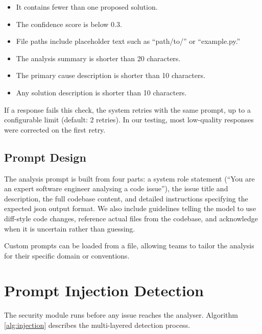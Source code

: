 \begin{itemize}
\item It contains fewer than one proposed solution.
\item The confidence score is below 0.3.
\item File paths include placeholder text such as ``path/to/'' or ``example.py.''
\item The analysis summary is shorter than 20 characters.
\item The primary cause description is shorter than 10 characters.
\item Any solution description is shorter than 10 characters.
\end{itemize}

If a response fails this check, the system retries with the same prompt, up to a configurable limit (default: 2 retries). In our testing, most low-quality responses were corrected on the first retry.

\subsection{Prompt Design}
The analysis prompt is built from four parts: a system role statement (``You are an expert software engineer analysing a code issue''), the issue title and description, the full codebase content, and detailed instructions specifying the expected \gls{json} output format. We also include guidelines telling the model to use diff-style code changes, reference actual files from the codebase, and acknowledge when it is uncertain rather than guessing.

Custom prompts can be loaded from a file, allowing teams to tailor the analysis for their specific domain or conventions.

\section{Prompt Injection Detection}

The security module runs before any issue reaches the analyser. Algorithm \ref{alg:injection} describes the multi-layered detection process.


